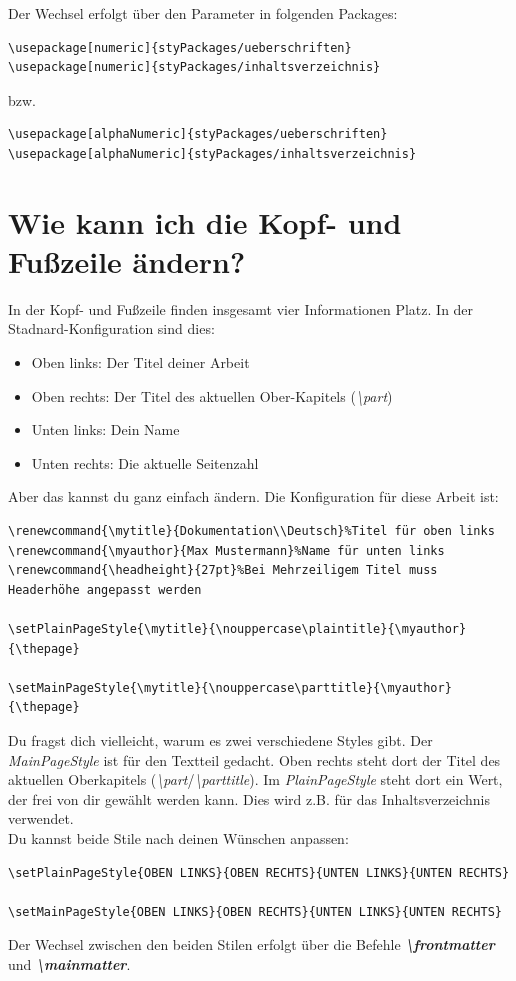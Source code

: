\documentclass[12pt]{article}
\begin{document}
\noindent Der Wechsel erfolgt über den Parameter in folgenden Packages:
\begin{lstlisting}
\usepackage[numeric]{styPackages/ueberschriften}
\usepackage[numeric]{styPackages/inhaltsverzeichnis}
\end{lstlisting}
bzw.
\begin{lstlisting}
\usepackage[alphaNumeric]{styPackages/ueberschriften}
\usepackage[alphaNumeric]{styPackages/inhaltsverzeichnis}
\end{lstlisting}

\section{Wie kann ich die Kopf- und Fußzeile ändern?}
In der Kopf- und Fußzeile finden insgesamt vier Informationen Platz. In der Stadnard-Konfiguration sind dies:
\begin{itemize}
\item Oben links: Der Titel deiner Arbeit
\item Oben rechts: Der Titel des aktuellen Ober-Kapitels (\textit{\textbackslash part})
\item Unten links: Dein Name
\item Unten rechts: Die aktuelle Seitenzahl
\end{itemize}
Aber das kannst du ganz einfach ändern. Die Konfiguration für diese Arbeit ist:
\begin{lstlisting}
\renewcommand{\mytitle}{Dokumentation\\Deutsch}%Titel für oben links
\renewcommand{\myauthor}{Max Mustermann}%Name für unten links
\renewcommand{\headheight}{27pt}%Bei Mehrzeiligem Titel muss Headerhöhe angepasst werden

\setPlainPageStyle{\mytitle}{\nouppercase\plaintitle}{\myauthor}{\thepage}

\setMainPageStyle{\mytitle}{\nouppercase\parttitle}{\myauthor}{\thepage}
\end{lstlisting}
Du fragst dich vielleicht, warum es zwei verschiedene Styles gibt. Der \textit{MainPageStyle} ist für den Textteil gedacht. Oben rechts steht dort der Titel des aktuellen Oberkapitels (\textit{\textbackslash part}/\textit{\textbackslash parttitle}). Im \textit{PlainPageStyle} steht dort ein Wert, der frei von dir gewählt werden kann. Dies wird z.B. für das Inhaltsverzeichnis verwendet.\\
Du kannst beide Stile nach deinen Wünschen anpassen:
\begin{lstlisting}
\setPlainPageStyle{OBEN LINKS}{OBEN RECHTS}{UNTEN LINKS}{UNTEN RECHTS}

\setMainPageStyle{OBEN LINKS}{OBEN RECHTS}{UNTEN LINKS}{UNTEN RECHTS}
\end{lstlisting}
Der Wechsel zwischen den beiden Stilen erfolgt über die Befehle \textit{\textbf{\textbackslash frontmatter}} und \textit{\textbf{\textbackslash mainmatter}}.
\end{document}
